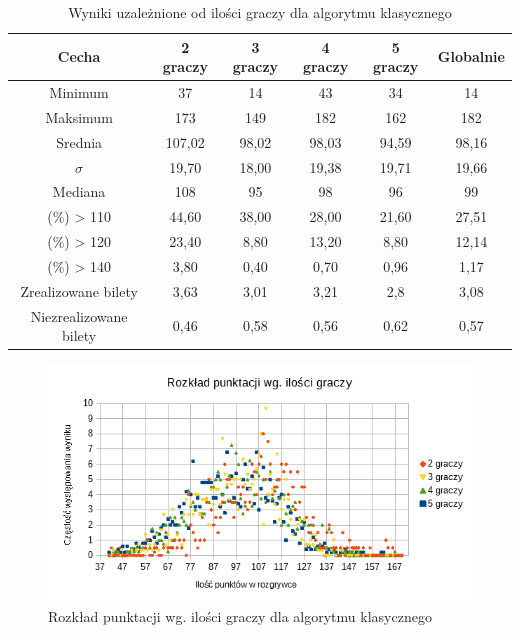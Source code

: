 \documentclass[12pt, oneside]{report}
\begin{document}
	\begin{table}[h]
		\begin{center}
			\begin{tabular}{| c | c | c | c | c | c |} \hline
				Cecha & 2 graczy & 3 graczy & 4 graczy & 5 graczy & Globalnie \\ \hline
				Minimum & 37 & 14 & 43 & 34 & 14 \\ \hline
				Maksimum & 173 & 149 & 182 & 162 & 182 \\ \hline
				Srednia & 107,02 & 98,02 & 98,03 & 94,59 & 98,16 \\ \hline
				\begin{math}
				\sigma
				\end{math}
				& 19,70 & 18,00 & 19,38 & 19,71 & 19,66 \\ \hline
				Mediana & 108 & 95 & 98 & 96 & 99 \\ \hline
				(\%) > 110 & 44,60 & 38,00 & 28,00 & 21,60 & 27,51 \\ \hline
				(\%) > 120 & 23,40 & 8,80 & 13,20 & 8,80 & 12,14 \\ \hline
				(\%) > 140 & 3,80 & 0,40 & 0,70 & 0,96 & 1,17 \\ \hline
				Zrealizowane bilety & 3,63 & 3,01 & 3,21 & 2,8 & 3,08 \\ \hline
				Niezrealizowane bilety & 0,46 & 0,58 & 0,56 & 0,62 & 0,57 \\ \hline
			\end{tabular}
			\caption{Wyniki uzależnione od ilości graczy dla algorytmu klasycznego}
			\label{table:algo_sizeresult}
		\end{center}
	\end{table}
	
	\begin{figure}
		\includegraphics[height=0.45\textheight,width=\textwidth]{Wykrespunktow.png}
		\caption{Rozkład punktacji wg. ilości graczy dla algorytmu klasycznego}
		\label{figure:player_points_algo}
	\end{figure}
	
\end{document}
